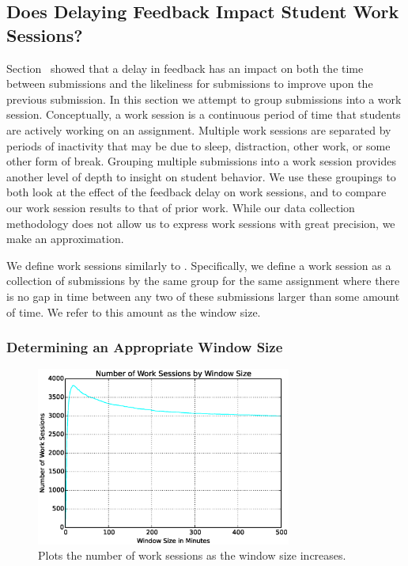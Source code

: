 \subsection{Does Delaying Feedback Impact Student Work Sessions?} 
Section~ showed that a delay in feedback has an impact
on both the time between submissions and the likeliness for submissions to
improve upon the previous submission. In this section we attempt to group
submissions into a work session. Conceptually, a work session is a continuous
period of time that students are actively working on an assignment. Multiple
work sessions are separated by periods of inactivity that may be due to sleep,
distraction, other work, or some other form of break. Grouping multiple
submissions into a work session provides another level of depth to insight on
student behavior. We use these groupings to both look at the effect of the
feedback delay on work sessions, and to compare our work session results to
that of prior work. While our data collection methodology does not allow us to
express work sessions with great precision, we make an approximation.

We define work sessions similarly to \spacco{}. Specifically, we define a work
session as a collection of submissions by the same group for the same
assignment where there is no gap in time between any two of these submissions
larger than some amount of time. We refer to this amount as the window size.

\subsubsection{Determining an Appropriate Window Size}

\begin{figure}[!t]
\centering \includegraphics[width=3.3in]{graphs/Number_of_Work_Sessions_by_Window_Size.eps}
\caption{Plots the number of work sessions as the window size increases.}
\end{figure}

